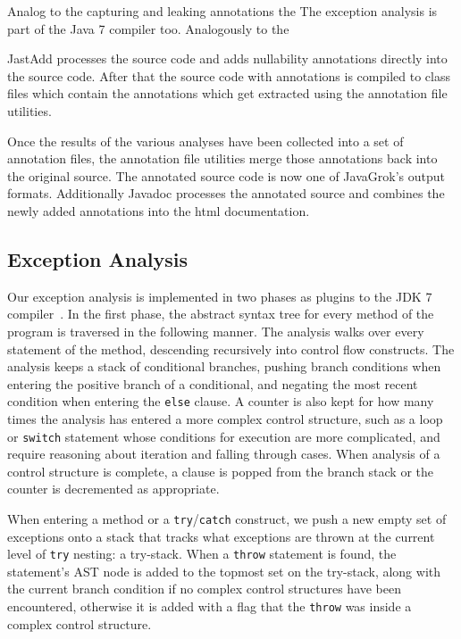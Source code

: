 Analog to the capturing and leaking annotations the 
The exception analysis is part of the Java 7 compiler too. Analogously to the

JastAdd processes the source code and adds nullability annotations
directly into the source code. After that the source code with annotations
is compiled to class files which contain the annotations which  
get extracted using the annotation file utilities.

Once the results of the various analyses have been collected into a set of
annotation files, the annotation file utilities merge
those annotations back into the original source. The annotated source
code is now one of JavaGrok's output formats. Additionally Javadoc processes
the annotated source and combines the newly added annotations into the html
documentation.

\subsection{Exception Analysis}
\label{sec:exception_impl}
Our exception analysis is implemented in two phases as plugins to the JDK 7
compiler~\cite{AFU,pluggable}.
In the first phase, the
abstract syntax tree for every method of the program is traversed in the
following manner.  The analysis walks over every statement of the method,
descending recursively into control flow constructs.  The analysis keeps a stack
of conditional branches, pushing branch conditions when entering the positive
branch of a conditional, and negating the most recent condition when entering
the \texttt{else} clause.  A counter is also kept for how many times the
analysis has entered a more complex control structure, such as a loop or
\texttt{switch} statement whose conditions for execution are more complicated,
and require reasoning about iteration and falling through cases.  When
analysis of a control structure is complete, a clause is popped from the
branch stack or the counter is decremented as appropriate.

When entering a method or a \texttt{try}/\texttt{catch} construct, we push a new empty set of exceptions onto
a stack that tracks what exceptions are thrown at the current level of
\texttt{try} nesting: a try-stack.
When a \texttt{throw} statement is found, the statement's AST node is added to the
topmost set on the try-stack, 
along with the current branch condition if no complex control structures have
been encountered, otherwise it is added with a flag that the \texttt{throw} was inside a
complex control structure.

